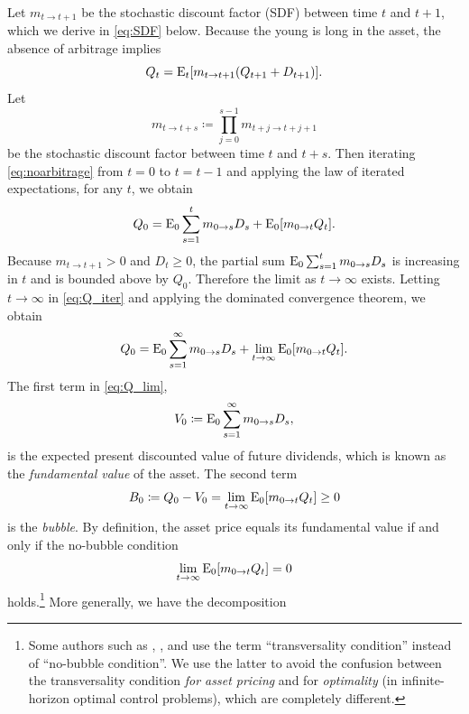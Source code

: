 \documentclass[a4paper,12pt]{article}
\numberwithin{equation}{section}
\theoremstyle{plain}
\begin{document}
Let $m_{t\to t+1}$ be the stochastic discount factor (SDF) between time $t$ and $t+1$, which we derive in \eqref{eq:SDF} below. Because the young is long in the asset, the absence of arbitrage implies
\begin{equation}
    Q_t=\operatorname{E}_t[m_{t\to t+1}(Q_{t+1}+D_{t+1})]. \label{eq:noarbitrage}
\end{equation}
Let
\begin{equation*}
    m_{t\to t+s}\coloneqq \prod_{j=0}^{s-1} m_{t+j\to t+j+1}
\end{equation*}
be the stochastic discount factor between time $t$ and $t+s$. Then iterating \eqref{eq:noarbitrage} from $t=0$ to $t=t-1$ and applying the law of iterated expectations, for any $t$, we obtain
\begin{equation}
    Q_0=\operatorname{E}_0\sum_{s=1}^t m_{0\to s} D_s+\operatorname{E}_0[m_{0\to t}Q_t]. \label{eq:Q_iter}
\end{equation}
Because $m_{t\to t+1}>0$ and $D_t\ge 0$, the partial sum $\operatorname{E}_0\sum_{s=1}^t m_{0\to s} D_s$ is increasing in $t$ and is bounded above by $Q_0$. Therefore the limit as $t\to\infty$ exists. Letting $t\to\infty$ in \eqref{eq:Q_iter} and applying the dominated convergence theorem, we obtain
\begin{equation}
    Q_0=\operatorname{E}_0\sum_{s=1}^\infty m_{0\to s} D_s+\lim_{t\to\infty} \operatorname{E}_0[m_{0\to t}Q_t]. \label{eq:Q_lim}
\end{equation}
The first term in \eqref{eq:Q_lim},
\begin{equation}
    V_0\coloneqq \operatorname{E}_0\sum_{s=1}^\infty m_{0\to s} D_s, \label{eq:V0}
\end{equation}
is the expected present discounted value of future dividends, which is known as the \emph{fundamental value} of the asset. The second term
\begin{equation}
    B_0\coloneqq Q_0-V_0=\lim_{t\to\infty} \operatorname{E}_0[m_{0\to t}Q_t]\ge 0 \label{eq:B0}
\end{equation}
is the \emph{bubble}. By definition, the asset price equals its fundamental value if and only if the no-bubble condition
\begin{equation}
    \lim_{t\to\infty} \operatorname{E}_0[m_{0\to t}Q_t]=0 \label{eq:nobubble}
\end{equation}
holds.\footnote{Some authors such as \citet{SantosWoodford1997}, \citet{Montrucchio2004}, and \citet{HiranoToda2025JPE} use the term ``transversality condition'' instead of ``no-bubble condition''. We use the latter to avoid the confusion between the transversality condition \emph{for asset pricing} and for \emph{optimality} (in infinite-horizon optimal control problems), which are completely different.} More generally, we have the decomposition
\end{document}
